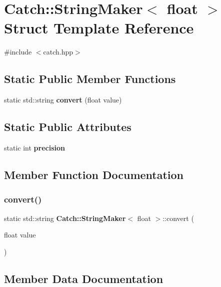\section{Catch\+::String\+Maker$<$ float $>$ Struct Template Reference}
\label{struct_catch_1_1_string_maker_3_01float_01_4}


{\ttfamily \#include $<$catch.\+hpp$>$}

\subsection*{Static Public Member Functions}
\begin{DoxyCompactItemize}
\item 
static std\+::string \textbf{ convert} (float value)
\end{DoxyCompactItemize}
\subsection*{Static Public Attributes}
\begin{DoxyCompactItemize}
\item 
static int \textbf{ precision}
\end{DoxyCompactItemize}


\subsection{Member Function Documentation}
\mbox{\label{struct_catch_1_1_string_maker_3_01float_01_4_a7ffacc6fa46a338200f3fbb2ee078648}} 
\subsubsection{convert()}
{\footnotesize\ttfamily static std\+::string \textbf{ Catch\+::\+String\+Maker}$<$ float $>$\+::convert (\begin{DoxyParamCaption}\item[{float}]{value }\end{DoxyParamCaption})\hspace{0.3cm}{\ttfamily [static]}}



\subsection{Member Data Documentation}
\mbox{\label{struct_catch_1_1_string_maker_3_01float_01_4_a54ebebe76a755dbe2dd8ad409c329378}} 
